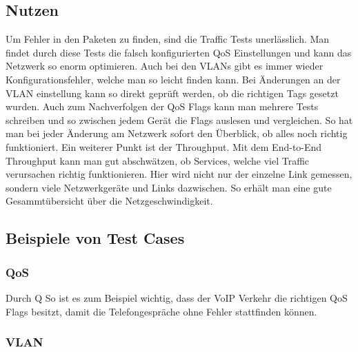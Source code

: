 \documentclass[a4,12pt]{scrartcl}
\begin{document}
\subsection{Nutzen}
Um Fehler in den Paketen zu finden, sind die Traffic Tests unerlässlich. Man findet durch diese Tests die falsch konfigurierten QoS Einstellungen und kann das Netzwerk so enorm optimieren. Auch bei den VLANs gibt es immer wieder Konfigurationsfehler, welche man so leicht finden kann.\newline
Bei Änderungen an der VLAN einstellung kann so direkt geprüft werden, ob die richtigen Tags gesetzt wurden.\newline
Auch zum Nachverfolgen der QoS Flags kann man mehrere Tests schreiben und so zwischen jedem Gerät die Flags auslesen und vergleichen.\newline
So hat man bei jeder Änderung am Netzwerk sofort den Überblick, ob alles noch richtig funktioniert.\newline
Ein weiterer Punkt ist der Throughput. Mit dem End-to-End Throughput kann man gut abschwätzen, ob Services, welche viel Traffic verursachen richtig funktionieren. Hier wird nicht nur der einzelne Link gemessen, sondern viele Netzwerkgeräte und Links dazwischen. So erhält man eine gute Gesammtübersicht über die Netzgeschwindigkeit.

\subsection{Beispiele von Test Cases}
\subsubsection{QoS}
Durch Q
So ist es zum Beispiel wichtig, dass der VoIP Verkehr die richtigen QoS Flags besitzt, damit die Telefongespräche ohne Fehler stattfinden können. 
\subsubsection{VLAN}
\end{document}
